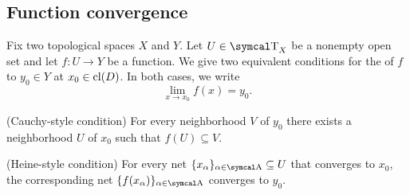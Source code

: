 \subsection{Function convergence}\label{subsec:function_convergence}

\begin{definition}\label{def:convergence_of_function_at_point}
  Fix two topological spaces \( X \) and \( Y \). Let \( U \in \CT_X \) be a nonempty open set and let \( f: U \to Y \) be a function. We give two equivalent conditions for the  of \( f \) to \( y_0 \in Y \) at \( x_0 \in \operatorname{cl}(D) \). In both cases, we write
  \begin{equation*}
    \lim_{x \to x_0} f(x) = y_0.
  \end{equation*}

  \begin{defenum}
    (Cauchy-style condition) For every neighborhood \( V \) of \( y_0 \) there exists a neighborhood \( U \) of \( x_0 \) such that \( f(U) \subseteq V \).

    (Heine-style condition) For every net \( \{ x_\al \}_{\al \in \CA} \subseteq U \) that converges to \( x_0 \), the corresponding net \( \{ f(x_\al) \}_{\al \in \CA} \) converges to \( y_0 \).
  \end{defenum}
\end{definition}
